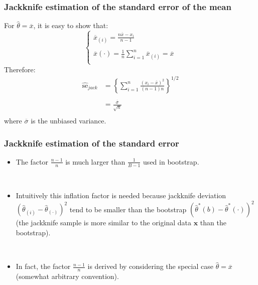 {
\frametitle{Jackknife estimation of the standard error of the mean}

For $\hat{\theta}=\overline{x}$, it is easy to show that: 
$$
\left\lbrace
\begin{array}{l}
\overline{x}_{(i)}=\frac{n\overline{x}-x_i}{n-1}\\
\\
\overline{x}(\cdot)=\frac{1}{n}\sum_{i=1}^{n} \overline{x}_{(i)}=\overline{x}\\
\end{array}
\right.
$$
 Therefore:
$$
\begin{array}{ll}
\widehat{\mathrm{se}}_{jack}&=\left\lbrace \sum_{i=1}^n \frac{(x_i-\overline{x})^2}{(n-1)n} \right\rbrace^{1/2}\\
&\\
& =  \frac{\overline{\sigma}}{\sqrt{n}}\\
\end{array}
$$
where $\overline{\sigma}$ is the unbiased variance. 

}
\frame
{
\frametitle{Jackknife estimation of the standard error}

\begin{itemize}
\item The factor $\frac{n-1}{n}$ is much larger than $\frac{1}{B-1}$ used in bootstrap. 

\

\item Intuitively this inflation factor is needed because jackknife deviation $(\hat{\theta}_{(i)}-\hat{\theta}_{(\cdot)})^{2}$ tend to be smaller than the bootstrap  $(\hat{\theta}^{*}(b)-\hat{\theta}^{*}(\cdot))^{2}$ (the jackknife sample is more similar to the original data $\mathbf{x}$ than the bootstrap).  

\

\item In fact, the factor $\frac{n-1}{n}$ is derived by considering the special case $\hat{\theta}=\overline{x}$ (somewhat arbitrary convention).  
\end{itemize}
}
\frame
